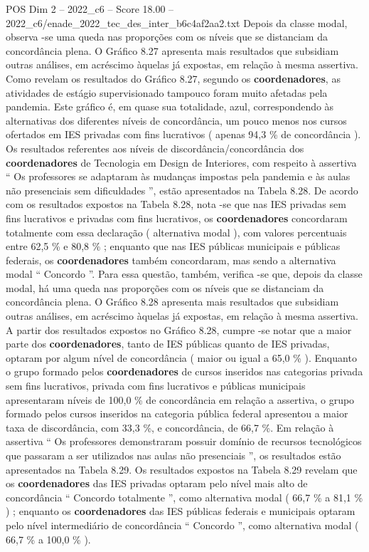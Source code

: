 \begin{textsample}{POS Dim 2 – 2022\_c6 – Score 18.00 – 2022\_c6/enade\_2022\_tec\_des\_inter\_b6c4af2aa2.txt}
Depois da classe modal, observa -se uma queda nas proporções com os níveis que se distanciam da concordância plena.
O Gráfico 8.27 apresenta mais resultados que subsidiam outras análises, em acréscimo àquelas já expostas, em relação à mesma assertiva.
Como revelam os resultados do Gráfico 8.27, segundo os \textbf{coordenadores}, as atividades de estágio supervisionado tampouco foram muito afetadas pela pandemia.
Este gráfico é, em quase sua totalidade, azul, correspondendo às alternativas dos diferentes níveis de concordância, um pouco menos nos cursos ofertados em IES privadas com fins lucrativos ( apenas 94,3 \% de concordância ).
Os resultados referentes aos níveis de discordância/concordância dos \textbf{coordenadores} de Tecnologia em Design de Interiores, com respeito à assertiva “ Os professores se adaptaram às mudanças impostas pela pandemia e às aulas não presenciais sem dificuldades ”, estão apresentados na Tabela 8.28.
De acordo com os resultados expostos na Tabela 8.28, nota -se que nas IES privadas sem fins lucrativos e privadas com fins lucrativos, os \textbf{coordenadores} concordaram totalmente com essa declaração ( alternativa modal ), com valores percentuais entre 62,5 \% e 80,8 \% ; enquanto que nas IES públicas municipais e públicas federais, os \textbf{coordenadores} também concordaram, mas sendo a alternativa modal “ Concordo ”.
Para essa questão, também, verifica -se que, depois da classe modal, há uma queda nas proporções com os níveis que se distanciam da concordância plena.
O Gráfico 8.28 apresenta mais resultados que subsidiam outras análises, em acréscimo àquelas já expostas, em relação à mesma assertiva.
A partir dos resultados expostos no Gráfico 8.28, cumpre -se notar que a maior parte dos \textbf{coordenadores}, tanto de IES públicas quanto de IES privadas, optaram por algum nível de concordância ( maior ou igual a 65,0 \% ).
Enquanto o grupo formado pelos \textbf{coordenadores} de cursos inseridos nas categorias privada sem fins lucrativos, privada com fins lucrativos e públicas municipais apresentaram níveis de 100,0 \% de concordância em relação a assertiva, o grupo formado pelos cursos inseridos na categoria pública federal apresentou a maior taxa de discordância, com 33,3 \%, e concordância, de 66,7 \%.
Em relação à assertiva “ Os professores demonstraram possuir domínio de recursos tecnológicos que passaram a ser utilizados nas aulas não presenciais ”, os resultados estão apresentados na Tabela 8.29.
Os resultados expostos na Tabela 8.29 revelam que os \textbf{coordenadores} das IES privadas optaram pelo nível mais alto de concordância “ Concordo totalmente ”, como alternativa modal ( 66,7 \% a 81,1 \% ) ; enquanto os \textbf{coordenadores} das IES públicas federais e municipais optaram pelo nível intermediário de concordância “ Concordo ”, como alternativa modal ( 66,7 \% a 100,0 \% ).

\end{textsample}
